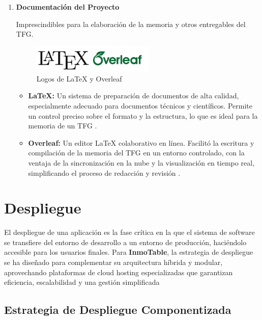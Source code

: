 \begin{enumerate}
    \item \textbf{Documentación del Proyecto}

    Imprescindibles para la elaboración de la memoria y otros entregables del TFG.

    \begin{figure}[H]
        \begin{center}
            \includegraphics[width = 0.55\textwidth]{Figuras/logoslatexoverleaf.png}
        \end{center}
        \caption{\label{fig:logoslatexoverleaf} Logos de LaTeX y Overleaf}
    \end{figure}

    \begin{itemize}
        \item \textbf{\LaTeX{}:} Un sistema de preparación de documentos de alta calidad, especialmente adecuado para documentos técnicos y científicos. Permite un control preciso sobre el formato y la estructura, lo que es ideal para la memoria de un TFG \cite{cascales2017latex}.
        \item \textbf{Overleaf:} Un editor \LaTeX{} colaborativo en línea. Facilitó la escritura y compilación de la memoria del TFG en un entorno controlado, con la ventaja de la sincronización en la nube y la visualización en tiempo real, simplificando el proceso de redacción y revisión \cite{overleaf2024learn}.
    \end{itemize}

\end{enumerate}


\section{Despliegue}


El despliegue de una aplicación es la fase crítica en la que el sistema de software se transfiere del entorno de desarrollo a un entorno de producción, haciéndolo accesible para los usuarios finales. Para \textbf{InmoTable}, la estrategia de despliegue se ha diseñado para complementar su arquitectura híbrida y modular, aprovechando plataformas de cloud hosting especializadas que garantizan eficiencia, escalabilidad y una gestión simplificada


\subsection{Estrategia de Despliegue Componentizada}


